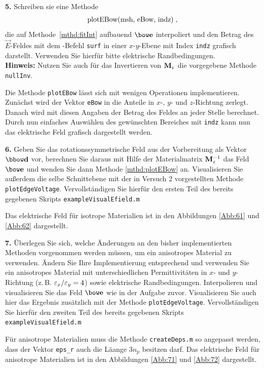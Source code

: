 \documentclass[Protokollheft.tex]{subfiles}
\begin{document}
\begin{framed}
	\noindent \textbf{5.} Schreiben sie eine Methode
\begin{align}
	\lstinline{plotEBow(msh, eBow, indz)} \; , \label{mthd:plotEBow}
\end{align}
die auf Methode~\eqref{mthd:fitInt} aufbauend $\efit$ interpoliert und den
Betrag des $\vec{E}$-Feldes mit dem \matlab-Befehl \lstinline{surf} in einer
$x$-$y$-Ebene mit Index \lstinline{indz} grafisch darstellt. Verwenden Sie hierfür bitte elektrische Randbedingungen.
\\
\textbf{Hinweis:} Nutzen Sie auch für das Invertieren von $\mathbf{M}_{\upvarepsilon}$ die vorgegebene Methode
\lstinline{nullInv}.\label{exer:plotEBow}
\end{framed}
\noindent
Die Methode \lstinline{plotEBow} lässt sich mit wenigen Operationen implementieren.
Zunächst wird der Vektor \lstinline{eBow} in die Anteile in $x$-, $y$- und $z$-Richtung zerlegt. Danach wird mit diesen Angaben der Betrag des Feldes an jeder Stelle berechnet. Durch nun einfaches Auswählen des gewünschten Bereiches mit \lstinline{indz} kann nun das elektrische Feld grafisch dargestellt werden.


\begin{framed}
	\noindent \textbf{6.} Geben Sie das rotationssymmetrische Feld aus der Vorbereitung als
Vektor $\dfit$ vor, berechnen Sie daraus mit Hilfe der Materialmatrix $\mathbf{M}_{\upvarepsilon}^{-1}$
das Feld $\efit$ und wenden Sie dann Methode \eqref{mthd:plotEBow} an. Visualisieren Sie außerdem die selbe Schnittebene mit der in Versuch 2 vorgestellten Methode \lstinline{plotEdgeVoltage}. Vervollständigen Sie hierfür den ersten Teil des bereits gegebenen Skripts \lstinline{exampleVisualEfield.m}\label{exer:exampleVisualEfield1}
\end{framed}
\noindent
Das elektrische Feld für isotrope Materialien ist in den Abbildungen \ref{Abb:61} und \ref{Abb:62} dargestellt.

\begin{framed}
	\noindent \textbf{7.} Überlegen Sie sich, welche Änderungen an den bisher implementierten Methoden 
vorgenommen werden müssen, um ein anisotropes Material zu verwenden. Ändern Sie 
Ihre Implementierung entsprechend und verwenden Sie ein anisotropes Material mit unterschiedlichen
Permittivitäten in $x$- und $y$-Richtung (z.\,B.
$\varepsilon_x / \varepsilon_y=4$) sowie elektrische
Randbedingungen. Interpolieren und visualisieren Sie das Feld
$\efit$ wie in der Aufgabe zuvor. Visualisieren Sie auch hier das Ergebnis zusätzlich mit der Methode \lstinline{plotEdgeVoltage}. Vervollständigen Sie hierfür den zweiten Teil des bereits gegebenen Skripts \lstinline{exampleVisualEfield.m}\label{exer:exampleVisualEfield2}\\
\end{framed}
\noindent
Für anisotrope Materialien muss die Methode \lstinline{createDeps.m} so angepasst werden, dass der Vektor \lstinline{eps_r} auch die Läange $3n_p$ besitzen darf. Das elektrische Feld für anisotrope Materialien ist in den Abbildungen \ref{Abb:71} und \ref{Abb:72} dargestellt.
\end{document}
